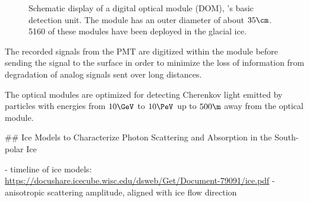 \begin{figure}[htbp]
  \hfill
  \caption{Schematic display of a digital optical module (DOM), \icecube's basic detection unit. The module has an outer diameter of about $35\cm$. 5160 of these modules have been deployed in the glacial ice.}
  \label{fig:aK4raigh}
\end{figure}


The recorded signals from the PMT are digitized within the module before sending the signal to the surface in order to minimize the loss of information from degradation of analog signals sent over long distances. \cite{firstyearperformance}

The optical modules are optimized for detecting Cherenkov light emitted by particles with energies from $10\GeV$ to $10\PeV$ up to $500\m$ away from the optical module. \cite{instrumentation}


## Ice Models to Characterize Photon Scattering and Absorption in the South-polar Ice
\label{sec:ice}

- timeline of ice models: \url{https://docushare.icecube.wisc.edu/dsweb/Get/Document-79091/ice.pdf} \cite{flasherdataderivedicemodels}
- anisotropic scattering amplitude, aligned with ice flow direction \cite{icrc17pocam}

